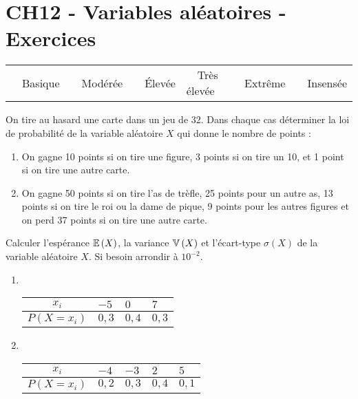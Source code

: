 \documentclass[a4paper,11pt]{article}
\author{Pierquet}
\title{\nomfichier}
\begin{document}
\pagestyle{fancy}

\part{CH12 - Variables aléatoires - Exercices}

\medskip

\begin{caide}
	{\setlength\arrayrulewidth{1.5pt} 
		\begin{tabularx}{\linewidth}{Y|Y|Y|Y|Y|Y}
			~~\textsf{Basique} & ~~\textsf{Modérée} & ~~\textsf{Élevée} & ~~\textsf{Très élevée} & ~~\textsf{Extrême} & ~~\textsf{Insensée} \\
	\end{tabularx}}
\end{caide}


\medskip

On tire au hasard une carte dans un jeu de 32. Dans chaque cas déterminer la loi de probabilité de la variable aléatoire $X$ qui donne le nombre de points :
\begin{enumerate}
	\item On gagne 10 points si on tire une figure, 3 points si on tire un 10, et 1 point si on tire une autre carte.
	\item On gagne 50 points si on tire l'as de trèfle, 25 points pour un autre as, 13 points si on tire le roi ou la dame de pique, 9 points pour les autres figures et on perd 37 points si on tire une autre carte.
\end{enumerate} 

\bigskip


\medskip

Calculer l'espérance $\mathbb{E}\left({X}\right)$, la variance $\mathbb{V}\left({X}\right)$ et l'écart-type $\sigma(X)$ de la variable aléatoire $X$. Si besoin arrondir à $10^{-2}$.
%
\begin{multicols}{2}
	\begin{enumerate}
		\item ~
		\begin{tabularx}{5cm}{|c|Y|Y|Y|}
			\hline
			$x_i$ & $-5$ & $0$ & $7$ \\ \hline
			$P(X=x_i)$ & $0,3$ & $0,4$ & $0,3$ \\ \hline
		\end{tabularx}
		\item ~
		\begin{tabularx}{6cm}{|c|Y|Y|Y|Y|}
			\hline
			$x_i$ & $-4$ & $-3$ & $2$ & $5$ \\ \hline
			$P(X=x_i)$ & $0,2$ & $0,3$ & $0,4$ & $0,1$ \\ \hline
		\end{tabularx}
	\end{enumerate}
\end{multicols}
\end{document}
